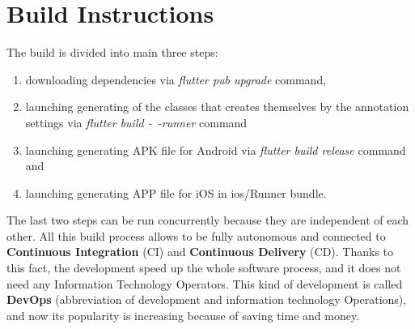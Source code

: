 \section{Build Instructions}\label{sec:build-instructions}
The build is divided into main three steps:
\begin{enumerate}
    \item downloading dependencies via \textit{flutter pub upgrade} command,
    \item launching generating of the classes that creates themselves by the annotation settings via \textit{flutter build -~-runner} command
    \item launching generating APK file for Android via \textit{flutter build release} command and
    \item launching generating APP file for iOS in ios/Runner bundle.
\end{enumerate}
The last two steps can be run concurrently because they are independent of each other.
All this build process allows to be fully autonomous and connected to \textbf{Continuous Integration} (CI) and \textbf{Continuous Delivery} (CD).
Thanks to this fact, the development speed up the whole software process, and it does not need any Information Technology Operators.
This kind of development is called \textbf{DevOps} (abbreviation of development and information technology Operations), and now its popularity is increasing because of saving time and money.
